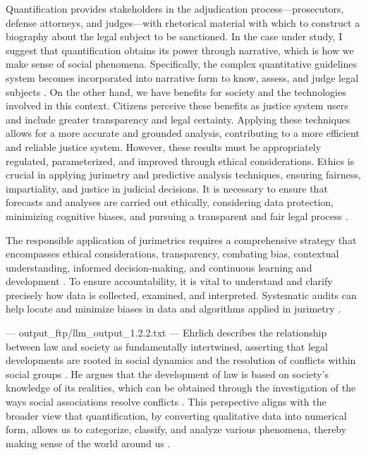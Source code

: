 Quantification provides stakeholders in the adjudication process—prosecutors, defense attorneys, and judges—with rhetorical material with which to construct a biography about the legal subject to be sanctioned. In the case under study, I suggest that quantification obtains its power through narrative, which is how we make sense of social phenomena. Specifically, the complex quantitative guidelines system becomes incorporated into narrative form to know, assess, and judge legal subjects \cite{10_1111_lsi_12334}. On the other hand, we have benefits for society and the technologies involved in this context. Citizens perceive these benefits as justice system users and include greater transparency and legal certainty. Applying these techniques allows for a more accurate and grounded analysis, contributing to a more efficient and reliable justice system. However, these results must be appropriately regulated, parameterized, and improved through ethical considerations. Ethics is crucial in applying jurimetry and predictive analysis techniques, ensuring fairness, impartiality, and justice in judicial decisions. It is necessary to ensure that forecasts and analyses are carried out ethically, considering data protection, minimizing cognitive biases, and pursuing a transparent and fair legal process \cite{10_1007_s11024_022_09481_w}.

The responsible application of jurimetrics requires a comprehensive strategy that encompasses ethical considerations, transparency, combating bias, contextual understanding, informed decision-making, and continuous learning and development \cite{10.1590/data.2022.65.3.267,in_the_law_viewmetadatacitationsimilarpapers_2014}. To ensure accountability, it is vital to understand and clarify precisely how data is collected, examined, and interpreted. Systematic audits can help locate and minimize biases in data and algorithms applied in jurimetry \cite{10.1590/data.2022.65.3.267,in_the_law_viewmetadatacitationsimilarpapers_2014}.


---
output_ftp/llm_output_1.2.2.txt
---
Ehrlich describes the relationship between law and society as fundamentally intertwined, asserting that legal developments are rooted in social dynamics and the resolution of conflicts within social groups \cite{ehrlich1967fundamentos}. He argues that the development of law is based on society's knowledge of its realities, which can be obtained through the investigation of the ways social associations resolve conflicts \cite{ehrlich1967fundamentos}. This perspective aligns with the broader view that quantification, by converting qualitative data into numerical form, allows us to categorize, classify, and analyze various phenomena, thereby making sense of the world around us \cite{10.1590/data.2022.65.3.267,10.1080/07329113.2015.1046739}.

